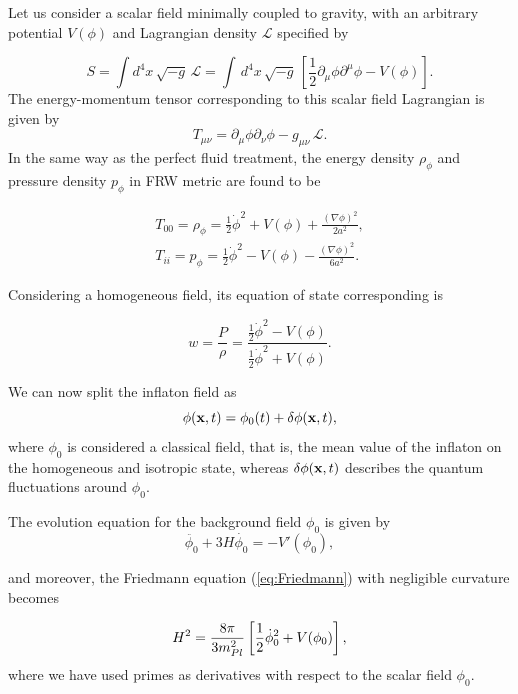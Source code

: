 \documentclass{rmaa}
\def\beq{\begin{equation}}
\def\eeq{\end{equation}}
\begin{document}
Let us consider a scalar field minimally coupled to gravity, with an arbitrary
potential $V(\phi)$ and Lagrangian density $\mathcal{L}$ specified by 


\begin{equation}
S=\int d^4x\, \sqrt{-g}\,\mathcal{L}=\int\, d^4x\, \sqrt{-g}\,
\left[\frac{1}{2}
\partial_{\mu}\phi
\partial^{\mu}\phi -V(\phi)\right].
\end{equation}
%
%
The energy-momentum tensor corresponding to this scalar field Lagrangian is given by
\beq
T_{\mu\nu}=\partial_{\mu}\phi \partial_{\nu}\phi
-g_{\mu\nu}\, \mathcal{L}.
\eeq
%
In the same way as the perfect fluid treatment, the 
energy density $\rho_\phi$ and pressure density $p_\phi$ in FRW metric are found to be 

\begin{eqnarray}
T_{00}=\rho_{\phi}=\frac{1}{2}\dot{\phi}^2 + V(\phi)+ 
\frac{(\nabla \phi)^2}{2a^2},  \\
T_{ii}=p_{\phi}=\frac{1}{2}\dot{\phi}^2 - V(\phi)- \frac{(\nabla
\phi)^2}{6a^2}.
\end{eqnarray}

\noindent
Considering a homogeneous field, its equation of state corresponding is
 
\begin{equation}
w = \frac{P}{\rho}=\frac{\frac{1}{2}\dot \phi^2-V(\phi)}{\frac{1}{2}\dot \phi^2+V(\phi)}.
\end{equation}

\noindent
We can now split the inflaton field as
\beq \label{eq:split}
\phi({\bf x},t)=\phi_{0}(t)+\delta\phi({\bf x},t),
\eeq
where $\phi_{0}$ is considered a classical field, that is, 
the mean value of the inflaton on the homogeneous and isotropic state, 
whereas $\delta\phi({\bf x},t)$ describes the quantum fluctuations around $\phi_{0}$.

\noindent
The evolution equation for the background field $\phi_0$  is given by
\begin{equation}
\ddot{\phi_0}+ 3H\dot{\phi_0}= -V'(\phi_0),
\label{eq:motion1}
\end{equation}

\noindent
and moreover, the Friedmann equation (\ref{eq:Friedmann}) with negligible curvature becomes

\beq \label{eq:motion2}
H^2 = \frac{8\pi}{3m^2_{Pl}} \left[{1 \over 2} \dot\phi_0^2 +V(\phi_0)\right],
\eeq
where we have used 
primes as derivatives with respect to the scalar field $\phi_0$. 
\\
\end{document}
